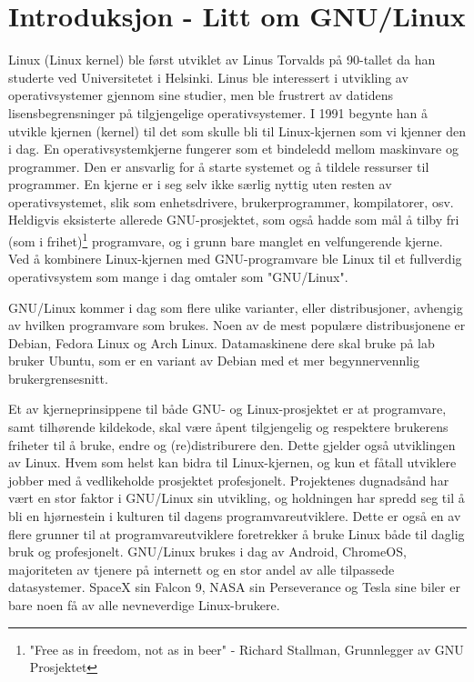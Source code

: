 \section{Introduksjon - Litt om GNU/Linux}

Linux (Linux kernel) ble først utviklet av Linus Torvalds på 90-tallet da han studerte ved Universitetet i Helsinki. Linus ble interessert i utvikling av operativsystemer gjennom sine studier, men ble frustrert av datidens lisensbegrensninger på tilgjengelige operativsystemer. I 1991 begynte han å utvikle kjernen (kernel) til det som skulle bli til Linux-kjernen som vi kjenner den i dag. En operativsystemkjerne fungerer som et bindeledd mellom maskinvare og programmer. Den er ansvarlig for å starte systemet og å tildele ressurser til programmer. En kjerne er i seg selv ikke særlig nyttig uten resten av operativsystemet, slik som enhetsdrivere, brukerprogrammer, kompilatorer, osv. Heldigvis eksisterte allerede GNU-prosjektet, som også hadde som mål å tilby fri (som i frihet)\footnote{"Free as in freedom, not as in beer" - Richard Stallman, Grunnlegger av GNU Prosjektet} programvare, og i grunn bare manglet en velfungerende kjerne. Ved å kombinere Linux-kjernen med GNU-programvare ble Linux til et fullverdig operativsystem som mange i dag omtaler som "GNU/Linux". 

GNU/Linux kommer i dag som flere ulike varianter, eller distribusjoner, avhengig av hvilken programvare som brukes. Noen av de mest populære distribusjonene er Debian, Fedora Linux og Arch Linux. Datamaskinene dere skal bruke på lab bruker Ubuntu, som er en variant av Debian med et mer begynnervennlig brukergrensesnitt.

Et av kjerneprinsippene til både GNU- og Linux-prosjektet er at programvare, samt tilhørende kildekode, skal være åpent tilgjengelig og respektere brukerens friheter til å bruke, endre og (re)distriburere den. Dette gjelder også utviklingen av Linux. Hvem som helst kan bidra til Linux-kjernen, og kun et fåtall utviklere jobber med å vedlikeholde prosjektet profesjonelt. Projektenes dugnadsånd har vært en stor faktor i GNU/Linux sin utvikling, og holdningen har spredd seg til å bli en hjørnestein i kulturen til dagens programvareutviklere. Dette er også en av flere grunner til at programvareutviklere foretrekker å bruke Linux både til daglig bruk og profesjonelt. GNU/Linux brukes i dag av Android, ChromeOS, majoriteten av tjenere på internett og en stor andel av alle tilpassede datasystemer. SpaceX sin Falcon 9, NASA sin Perseverance og Tesla sine biler er bare noen få av alle nevneverdige Linux-brukere. 


